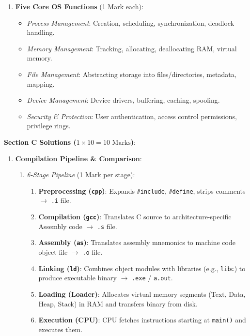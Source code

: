 \begin{solutionbox}
\begin{enumerate}[start=6]
    \item \textbf{Five Core OS Functions} (1 Mark each):
    \begin{itemize}
        \item \textit{Process Management}: Creation, scheduling, synchronization, deadlock handling.
        \item \textit{Memory Management}: Tracking, allocating, deallocating RAM, virtual memory.
        \item \textit{File Management}: Abstracting storage into files/directories, metadata, mapping.
        \item \textit{Device Management}: Device drivers, buffering, caching, spooling.
        \item \textit{Security \& Protection}: User authentication, access control permissions, privilege rings.
    \end{itemize}
\end{enumerate}

\medskip
\noindent\textbf{Section C Solutions ($1 \times 10 = 10\text{ Marks}$)}:
\begin{enumerate}[start=8]
    \item \textbf{Compilation Pipeline \& Comparison}:
    \begin{enumerate}[label=(\alph*)]
        \item \textit{6-Stage Pipeline} (1 Mark per stage):
        \begin{enumerate}
            \item \textbf{Preprocessing (\texttt{cpp})}: Expands \texttt{\#include}, \texttt{\#define}, strips comments $\rightarrow$ \texttt{.i} file.
            \item \textbf{Compilation (\texttt{gcc})}: Translates C source to architecture-specific Assembly code $\rightarrow$ \texttt{.s} file.
            \item \textbf{Assembly (\texttt{as})}: Translates assembly mnemonics to machine code object file $\rightarrow$ \texttt{.o} file.
            \item \textbf{Linking (\texttt{ld})}: Combines object modules with libraries (e.g., \texttt{libc}) to produce executable binary $\rightarrow$ \texttt{.exe} / \texttt{a.out}.
            \item \textbf{Loading (Loader)}: Allocates virtual memory segments (Text, Data, Heap, Stack) in RAM and transfers binary from disk.
            \item \textbf{Execution (CPU)}: CPU fetches instructions starting at \texttt{main()} and executes them.
        \end{enumerate}


\end{enumerate}
\end{enumerate}
\end{solutionbox}
